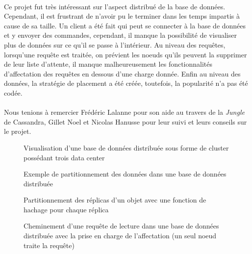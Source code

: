 \documentclass[12pt]{article}
\begin{document}
\paragraph{}Ce projet fut très intéressant sur l'aspect distribué de la base de données. Cependant, il est frustrant de n'avoir pu le terminer dans les temps impartis à cause de sa taille. Un client a été fait qui peut se connecter à la base de données et y envoyer des commandes, cependant, il manque la possibilité de visualiser plus de données sur ce qu'il se passe à l'intérieur. Au niveau des requêtes, lorsqu'une requête est traitée, on prévient les noeuds qu'ils peuvent la supprimer de leur liste d'attente, il manque malheureusement les fonctionnalités d'affectation des requêtes en dessous d'une charge donnée. Enfin au niveau des données, la stratégie de placement a été créée, toutefois, la popularité n'a pas été codée.

\paragraph{}Nous tenions à remercier Frédéric Lalanne pour son aide au travers de la \textit{Jungle} de Cassandra, Gillet Noel et Nicolas Hanusse pour leur suivi et leurs conseils sur le projet.





\begin{figure}[H]
	\centering
		
	\caption{Visualisation d'une base de données distribuée sous forme de cluster possédant trois data center\label{fig:distributed_database}}
\end{figure}

\begin{figure}[H]
	\centering
		
	\caption{Exemple de partitionnement des données dans une base de données distribuée\label{fig:partitionning}}
\end{figure}

\begin{figure}[H]
	\centering
		
	\caption{Partitionnement des réplicas d'un objet avec une fonction de hachage pour chaque réplica\label{fig:multi_hash_partitionning}}
\end{figure}

\begin{figure}[H]
	\centering
		
	\caption{Cheminement d'une requête de lecture dans une base de données distribuée avec la prise en charge de l'affectation (un seul noeud traite la requête)\label{fig:request}}
\end{figure}
\end{document}
